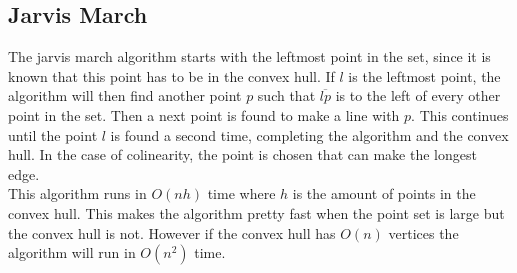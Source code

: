\documentclass{article}
\begin{document}
\subsection*{Jarvis March}
The jarvis march algorithm starts with the leftmost point in the set, since it is known that this point has to be in the convex hull. 
If $l$ is the leftmost point, the algorithm will then find another point $p$ such that $\overline{lp}$ is to the left of every other point in the set. 
Then a next point is found to make a line with $p$. This continues until the point $l$ is found a second time, completing the algorithm and the convex hull.
In the case of colinearity, the point is chosen that can make the longest edge.
\\
This algorithm runs in $O(nh)$ time where $h$ is the amount of points in the convex hull. This makes the algorithm pretty fast when the point set is large but the convex hull is not.
However if the convex hull has $O(n)$ vertices the algorithm will run in $O(n^2)$ time.
\end{document}
